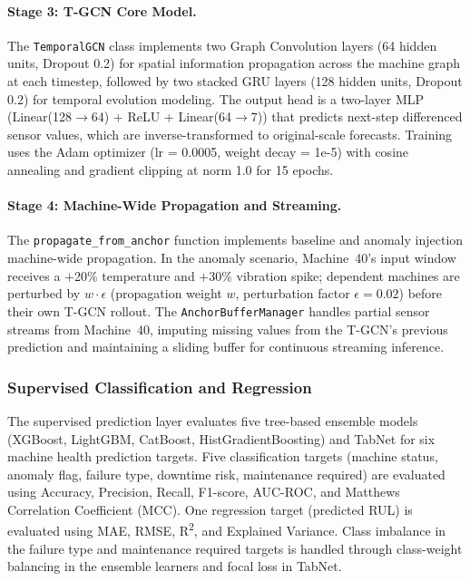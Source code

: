\paragraph{Stage 3: T-GCN Core Model.} The \texttt{TemporalGCN} class implements two Graph Convolution layers (64 hidden units, Dropout 0.2) for spatial information propagation across the machine graph at each timestep, followed by two stacked GRU layers (128 hidden units, Dropout 0.2) for temporal evolution modeling. The output head is a two-layer MLP (Linear(128$\to$64) + ReLU + Linear(64$\to$7)) that predicts next-step differenced sensor values, which are inverse-transformed to original-scale forecasts. Training uses the Adam optimizer (lr = 0.0005, weight decay = 1e-5) with cosine annealing and gradient clipping at norm 1.0 for 15 epochs.

\paragraph{Stage 4: Machine-Wide Propagation and Streaming.} The \texttt{propagate\_from\_anchor} function implements baseline and anomaly injection machine-wide propagation. In the anomaly scenario, Machine~40's input window receives a $+$20\% temperature and $+$30\% vibration spike; dependent machines are perturbed by $w \cdot \epsilon$ (propagation weight $w$, perturbation factor $\epsilon = 0.02$) before their own T-GCN rollout. The \texttt{AnchorBufferManager} handles partial sensor streams from Machine~40, imputing missing values from the T-GCN's previous prediction and maintaining a sliding buffer for continuous streaming inference.

\subsubsection{Supervised Classification and Regression}

The supervised prediction layer evaluates five tree-based ensemble models (XGBoost, LightGBM, CatBoost, HistGradientBoosting) and TabNet for six machine health prediction targets. Five classification targets (machine status, anomaly flag, failure type, downtime risk, maintenance required) are evaluated using Accuracy, Precision, Recall, F1-score, AUC-ROC, and Matthews Correlation Coefficient (MCC). One regression target (predicted RUL) is evaluated using MAE, RMSE, R\textsuperscript{2}, and Explained Variance. Class imbalance in the failure type and maintenance required targets is handled through class-weight balancing in the ensemble learners and focal loss in TabNet.

